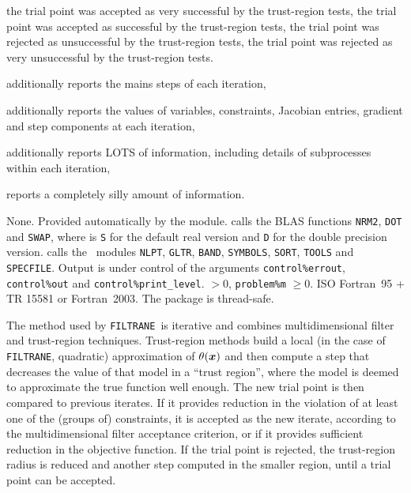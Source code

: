 \documentclass{galahad}
\newcommand{\packagename}{FILTRANE}
\newcommand{\sym}{\sf\small}
\newcommand{\filtrane}{{\tt \packagename}}
\begin{document}
\begin{description}
\begin{description}
 the trial point was accepted as very successful by the trust-region
tests,
 the trial point was accepted as successful by the trust-region
tests,
 the trial point was rejected as unsuccessful by the trust-region
tests,
 the trial point was rejected as very unsuccessful by the
trust-region tests.
\end{description}
\item[\sym GALAHAD\_ACTION:] additionally reports the mains steps of each
iteration,
\item[\sym GALAHAD\_DETAILS:] additionally reports the values of variables,
constraints,  Jacobian entries, gradient and step components at each
iteration,
\item[\sym GALAHAD\_DEBUG:] additionally reports LOTS of information,
including details of subprocesses within each iteration,
\item[\sym GALAHAD\_CRAZY:] reports a completely silly amount of information.
\end{description}


\galgeneral

\galcommon None.
\galworkspace Provided automatically by the module.
\galroutines {\tt \packagename\_solve} calls the BLAS functions {\tt *NRM2},
{\tt *DOT} and {\tt *SWAP}, where {\tt *} is {\tt S} for 
the default real version and {\tt D} for the double precision version.
\galmodules {\tt \packagename} calls the \galahad\ modules
{\tt NLPT}, {\tt GLTR}, {\tt BAND}, {\tt SYMBOLS}, {\tt SORT}, {\tt TOOLS} and
{\tt SPECFILE}. 
\galio Output is under control of the arguments
 {\tt control\%errout}, {\tt control\%out} and {\tt control\%print\_level}.
 $> 0$, 
{\tt problem\%m} $\geq  0$.
\galportability ISO Fortran~95 + TR 15581 or Fortran~2003. 
The package is thread-safe.


\galmethod

The method used by \filtrane\ is iterative and combines multidimensional
filter and trust-region techniques.  Trust-region methods 
build a local (in the case of \filtrane , quadratic) approximation of
$\theta({\bm{x}})$ and then compute a step that decreases the value of that model
in a ``trust region'', where the model is deemed to approximate the true
function well enough. The new trial point is then compared to previous
iterates. If it provides reduction in the violation of at least one of the
(groups of) constraints, it is accepted as the new iterate, according to the
multidimensional filter acceptance criterion, or if it provides sufficient
reduction in the objective function. If the trial point is rejected,
the trust-region radius is reduced and another step computed in the smaller
region, until a trial point can be accepted.
\end{document}
